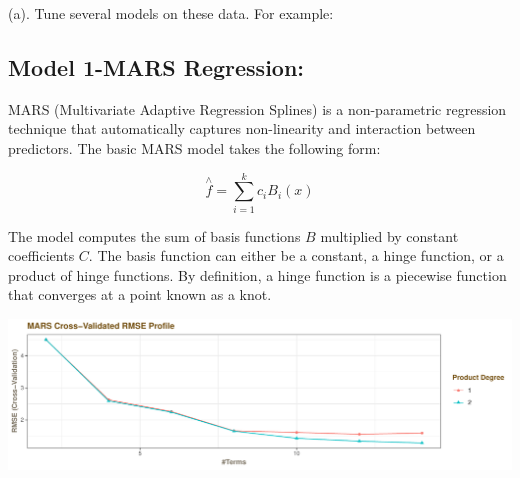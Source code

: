 \documentclass[]{report}
\newenvironment{Shaded}{\begin{snugshade}}{\end{snugshade}}
\newcommand{\KeywordTok}[1]{\textcolor[rgb]{0.13,0.29,0.53}{\textbf{#1}}}
\newcommand{\DataTypeTok}[1]{\textcolor[rgb]{0.13,0.29,0.53}{#1}}
\newcommand{\DecValTok}[1]{\textcolor[rgb]{0.00,0.00,0.81}{#1}}
\newcommand{\StringTok}[1]{\textcolor[rgb]{0.31,0.60,0.02}{#1}}
\newcommand{\OperatorTok}[1]{\textcolor[rgb]{0.81,0.36,0.00}{\textbf{#1}}}
\newcommand{\NormalTok}[1]{#1}
\begin{document}
\begin{subquestion}{(a).} Tune several models on these data. For example: 
\end{subquestion}

\begin{Shaded}
\end{Shaded}

\subsection{Model 1-MARS Regression:}\label{model-1-mars-regression}

MARS (Multivariate Adaptive Regression Splines) is a non-parametric
regression technique that automatically captures non-linearity and
interaction between predictors. The basic MARS model takes the following
form:

\[
\overset { \wedge  }{ f } =\sum _{ i=1 }^{ k }{ { c }_{ i }{ B }_{ i }(x) } 
\]

The model computes the sum of basis functions \(B\) multiplied by
constant coefficients \(C\). The basis function can either be a
constant, a hinge function, or a product of hinge functions. By
definition, a hinge function is a piecewise function that converges at a
point known as a knot.

\includegraphics{Homework-Two2_files/figure-latex/kj-7.2-1-1.pdf}
\end{document}
